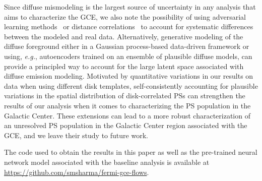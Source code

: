 \documentclass[prd,aps,10pt,nofootinbib,twocolumn,superscriptaddress,preprintnumbers,balancelastpage,longbibliography]{revtex4-1}
\begin{document}
Since diffuse mismodeling is the largest source of uncertainty in any analysis that aims to characterize the GCE, we also note the possibility of using adversarial learning methods~\cite{Louppe:2016ylz} or distance correlations~\cite{Kasieczka:2020yyl} to account for systematic differences between the modeled and real \Fermi data. Alternatively, generative modeling of the diffuse foreground either in a Gaussian process-based data-driven framework or using, \emph{e.g.}, autoencoders trained on an ensemble of plausible diffuse models, can provide a principled way to account for the large latent space associated with diffuse emission modeling. Motivated by quantitative variations in our results on \Fermi data when using different disk templates, self-consistently accounting for plausible variations in the spatial distribution of disk-correlated PSs can strengthen the results of our analysis when it comes to characterizing the PS population in the Galactic Center. 
These extensions can lead to a more robust characterization of an unresolved PS population in the Galactic Center region associated with the GCE, and we leave their study to future work.

The code used to obtain the results in this paper as well as the pre-trained neural network model associated with the baseline analysis is available at \url{https://github.com/smsharma/fermi-gce-flows}.


\vspace{.2cm}
\end{document}
